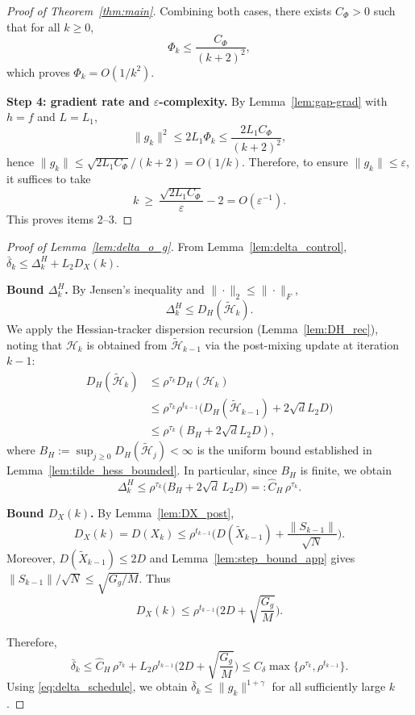 \documentclass[10pt,twocolumn,letterpaper]{article}
\def\cO{O}%
\theoremstyle{compact}
\theoremstyle{compactremark}
\newcommand{\cO}{\mathcal{O}}
\begin{document}
\begin{proof}[Proof of Theorem~\ref{thm:main}]
Combining both cases, there exists $C_\Phi>0$ such that for all $k\ge 0$,
\[
\Phi_k\le \frac{C_\Phi}{(k+2)^2},
\]
which proves $\Phi_k=\cO(1/k^2)$.

\vspace{1pt}
\noindent\textbf{Step 4: gradient rate and $\varepsilon$-complexity.}
By Lemma~\ref{lem:gap-grad} with $h=f$ and $L=L_1$,
\[
\|g_k\|^2\le 2L_1\Phi_k\le \frac{2L_1 C_\Phi}{(k+2)^2},
\]
hence $\|g_k\|\le \sqrt{2L_1 C_\Phi}/(k+2)=\cO(1/k)$.
Therefore, to ensure $\|g_k\|\le \varepsilon$, it suffices to take
\[
k\ \ge\ \frac{\sqrt{2L_1 C_\Phi}}{\varepsilon}-2
=\cO(\varepsilon^{-1}).
\]
This proves items 2--3.
\end{proof}

\begin{proof}[Proof of Lemma~\ref{lem:delta_o_g}]
From Lemma~\ref{lem:delta_control}, $\bar\delta_k\le \Delta_k^H+L_2D_X(k)$.

\vspace{1pt}
\noindent\textbf{Bound $\Delta_k^H$.}
By Jensen's inequality and $\|\cdot\|_2\le \|\cdot\|_F$,
\[
\Delta_k^H\le D_H(\tilde{\mathcal H}_k).
\]
We apply the Hessian-tracker dispersion recursion (Lemma~\ref{lem:DH_rec}),
noting that $\mathcal H_k$ is obtained from $\tilde{\mathcal H}_{k-1}$
via the post-mixing update at iteration $k{-}1$:
\begin{align*}
D_H(\tilde{\mathcal H}_k)
&\le \rho^{\tau_k}D_H(\mathcal H_k)\\
&\le \rho^{\tau_k}\rho^{t_{k-1}}\bigl(D_H(\tilde{\mathcal H}_{k-1})
\!+\!2\sqrt{d}L_2D\bigr)\\
&\le \rho^{\tau_k}(B_H\!+\!2\sqrt{d}L_2D),
\end{align*}
where $B_H:=\sup_{j\ge 0}D_H(\tilde{\mathcal H}_j)<\infty$ is the uniform bound
established in Lemma~\ref{lem:tilde_hess_bounded}.
In particular, since $B_H$ is finite, we obtain
\[
\Delta_k^H\le \rho^{\tau_k}\big(B_H+2\sqrt{d}\,L_2D\big)
=:\hat C_H\,\rho^{\tau_k}.
\]

\vspace{1pt}
\noindent\textbf{Bound $D_X(k)$.}
By Lemma~\ref{lem:DX_post},
\[
D_X(k)=D(X_k)\le \rho^{t_{k-1}}\Big(D(\tilde X_{k-1})+\frac{\|S_{k-1}\|}{\sqrt N}\Big).
\]
Moreover, $D(\tilde X_{k-1})\le 2D$ and Lemma~\ref{lem:step_bound_app} gives $\|S_{k-1}\|/\sqrt N\le \sqrt{G_g/M}$.
Thus
\[
D_X(k)\le \rho^{t_{k-1}}\Big(2D+\sqrt{\frac{G_g}{M}}\Big).
\]

\vspace{1pt}
Therefore,
\[
\bar\delta_k\le \hat C_H\,\rho^{\tau_k}
+L_2\rho^{t_{k-1}}\Big(2D+\sqrt{\frac{G_g}{M}}\Big)
\le C_\delta\max\{\rho^{\tau_k},\rho^{t_{k-1}}\}.
\]
Using \eqref{eq:delta_schedule}, we obtain $\bar\delta_k\le \|g_k\|^{1+\gamma}$ for all sufficiently large $k$.
\end{proof}
\end{document}
